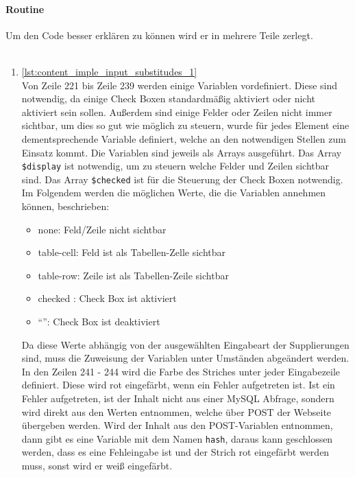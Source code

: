 \paragraph{Routine\\}
Um den Code besser erklären zu können wird er in mehrere Teile zerlegt.\\
\\
\begin{enumerate}
	\item \autoref{lst:content_imple_input_substitudes_1}\\
	Von Zeile 221 bis Zeile 239 werden einige Variablen vordefiniert. Diese sind notwendig, da einige Check Boxen standardmäßig aktiviert oder nicht aktiviert sein sollen. Außerdem sind einige Felder oder Zeilen nicht immer sichtbar, um dies so gut wie möglich zu steuern, wurde für jedes Element eine dementsprechende Variable definiert, welche an den notwendigen Stellen zum Einsatz kommt. Die Variablen sind jeweils als Arrays ausgeführt. Das Array \texttt{\$display} ist notwendig, um zu steuern welche Felder und Zeilen sichtbar sind. Das Array \texttt{\$checked} ist für die Steuerung der Check Boxen notwendig.
	Im Folgendem werden die möglichen Werte, die die Variablen annehmen können, beschrieben:
	\begin{itemize}
		\item none: Feld/Zeile nicht sichtbar
		\item table-cell: Feld ist als Tabellen-Zelle sichtbar
		\item table-row: Zeile ist als Tabellen-Zeile sichtbar
		\item checked : Check Box ist aktiviert
		\item \enquote{}: Check Box ist deaktiviert
	\end{itemize}
	Da diese Werte abhängig von der ausgewählten Eingabeart der Supplierungen sind, muss die Zuweisung der Variablen unter Umständen abgeändert werden.\\
	In den Zeilen 241 - 244 wird die Farbe des Striches unter jeder Eingabezeile definiert. Diese wird rot eingefärbt, wenn ein Fehler aufgetreten ist. Ist ein Fehler aufgetreten, ist der Inhalt nicht aus einer MySQL Abfrage, sondern wird direkt aus den Werten entnommen, welche über POST der Webseite übergeben werden. Wird der Inhalt aus den POST-Variablen entnommen, dann gibt es eine Variable mit dem Namen \texttt{hash}, daraus kann geschlossen werden, dass es eine Fehleingabe ist und der Strich rot eingefärbt werden muss, sonst wird er weiß eingefärbt.\\
	
	

\end{enumerate}
